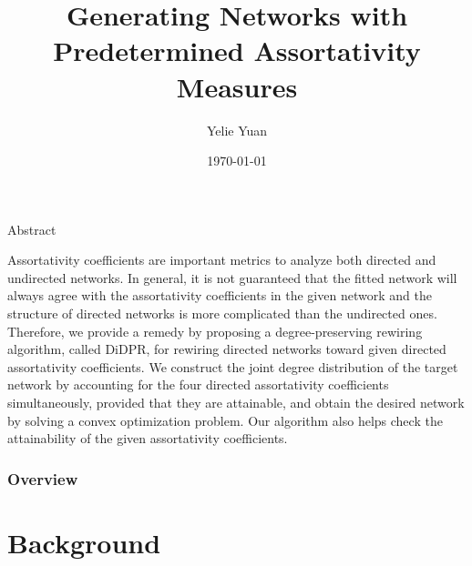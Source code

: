\documentclass[xcolor=dvipsnames, compress, 10pt]{beamer}
\title{Generating Networks with Predetermined Assortativity Measures}
\author{Yelie Yuan}
\institute{Department of Statistics, University of Connecticut}
\date{\today}
\theoremstyle{remark}
\begin{document}
\frame{\titlepage}

\begin{frame}{Abstract}

Assortativity coefficients are important metrics to analyze both directed and
undirected networks. In general, it is not guaranteed that the fitted network
will always agree with the assortativity coefficients in the given network and
the structure of directed networks is more complicated than the undirected ones.
Therefore, we provide a remedy by proposing a degree-preserving rewiring
algorithm, called DiDPR, for rewiring directed networks toward given directed
assortativity coefficients. We construct the joint degree distribution of the
target network by accounting for the four directed assortativity coefficients
simultaneously, provided that they are attainable, and obtain the desired
network by solving a convex optimization problem. Our algorithm also helps check
the attainability of the given assortativity coefficients.
	
\end{frame}


\begin{frame}
	\frametitle{Overview}
	\tableofcontents
\end{frame}


\section{Background}
\end{document}
